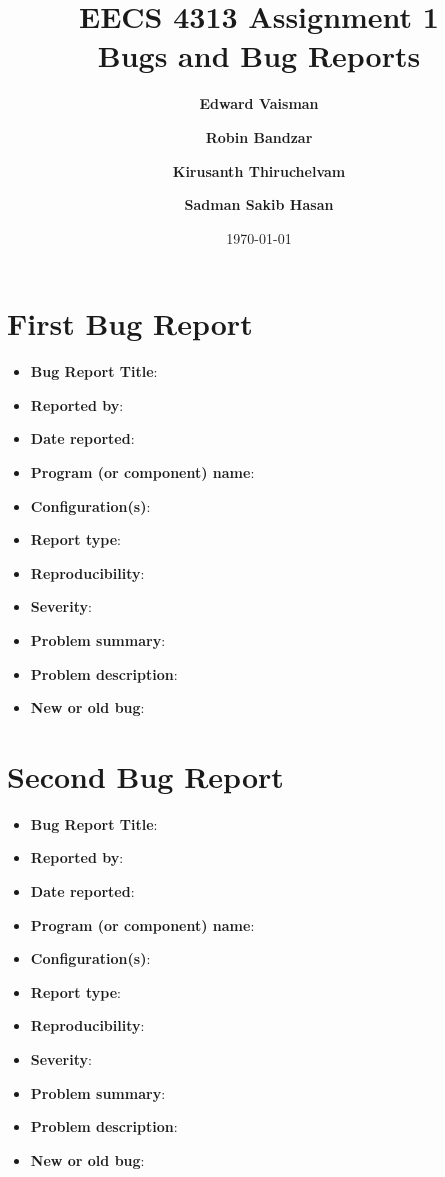 \documentclass[fontsize=12pt,paper=letter,twoside]{scrartcl}
\author{\textbf{Edward Vaisman}
\and \textbf{Robin Bandzar}
\and \textbf{Kirusanth Thiruchelvam}
\and \textbf{Sadman Sakib Hasan}
}
\date{\today} %
\begin{document}
\title{EECS 4313 Assignment 1 \\Bugs and Bug Reports}
\maketitle

\newpage

\tableofcontents


\newpage



\section{First Bug Report}

\begin{itemize}
\item \textbf{Bug Report Title}:
\item \textbf{Reported by}:
\item \textbf{Date reported}:
\item \textbf{Program (or component) name}:
\item \textbf{Configuration(s)}:
\item \textbf{Report type}:
\item \textbf{Reproducibility}:
\item \textbf{Severity}:
\item \textbf{Problem summary}:
\item \textbf{Problem description}:
\item \textbf{New or old bug}:
\end{itemize}

\newpage
\section{Second Bug Report}

\begin{itemize}
\item \textbf{Bug Report Title}:
\item \textbf{Reported by}:
\item \textbf{Date reported}:
\item \textbf{Program (or component) name}:
\item \textbf{Configuration(s)}:
\item \textbf{Report type}:
\item \textbf{Reproducibility}:
\item \textbf{Severity}:
\item \textbf{Problem summary}:
\item \textbf{Problem description}:
\item \textbf{New or old bug}:
\end{itemize}
\end{document}
